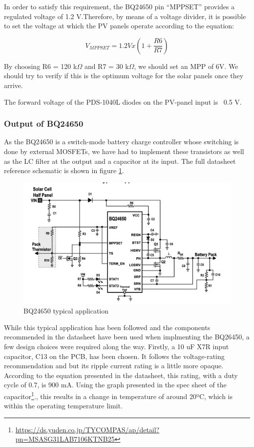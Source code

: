 \documentclass{article}
\begin{document}
In order to satisfy this requirement, the BQ24650 pin ``MPPSET'' provides a regulated voltage of 1.2 V.Therefore, by means of a voltage divider, it is possible to set the voltage at which the PV panels operate according to the equation:

\begin{equation}
	V_{MPPSET} = 1.2 V x (1 + \frac{R6}{R7})
\end{equation}

By choosing R6 = 120 k$\Omega$ and R7 = 30 k$\Omega$, we should set an MPP of 6V. We should try to verify if this is the optimum voltage for the solar panels once they arrive.

 The forward voltage of the PDS-1040L diodes on the PV-panel input is ~0.5 V. 
 
\subsubsection{Output of BQ24650}

As the BQ24650 is a switch-mode battery charge controller whose switching is done by external MOSFETs, we have had to implement these transistors as well as the LC filter at the output and a capacitor at its input. The full datasheet reference schematic is shown in figure \ref{fig:mesh3}.

\begin{figure}[h]
	\centering
   	 \includegraphics[width=\linewidth]{BQ24650-ref-schematic}
	\caption{BQ24650 typical application}
	\label{fig:mesh3}
\end{figure}

While this typical application has been followed and the components recommended in the datasheet have been used when implmenting the BQ26450, a few design choices were required along the way. Firstly, a 10 uF X7R input capacitor, C13 on the PCB, has been chosen. It follows the voltage-rating recommendation and but its ripple current rating is a little more opaque. According to the equation presented in the datasheet, this rating, with a duty cycle of 0.7, is 900 mA. Using the graph presented in the spec sheet of the capacitor\footnote{\href{https://ds.yuden.co.jp/TYCOMPAS/ap/detail?pn=MSASG31LAB7106KTNB25}{https://ds.yuden.co.jp/TYCOMPAS/ap/detail?pn=MSASG31LAB7106KTNB25}}., this results in a change in temperature of around 20ºC, which is within the operating temperature limit.
\end{document}
